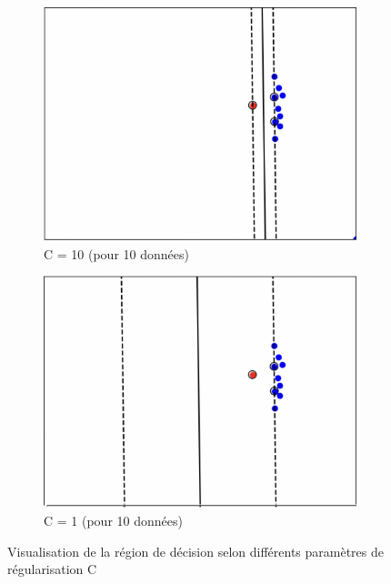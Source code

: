 \documentclass[a4paper,12pt]{article}
\begin{document}
\begin{figure}[H]
    \begin{subfigure}[b]{0.45\textwidth}
        \centering
        \includegraphics[width=\textwidth]{Images/C=10.png}
        \caption{C = 10 (pour 10 données)}
    \end{subfigure}
    \hfill
    \begin{subfigure}[b]{0.45\textwidth}
        \centering
        \includegraphics[width=\textwidth]{Images/C=1_bis.png}
        \caption{C = 1 (pour 10 données)}
    \end{subfigure}

    \caption{Visualisation de la région de décision selon différents paramètres de régularisation C}\label{fig : carre}
\end{figure}
\end{document}
